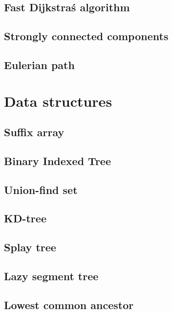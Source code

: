 \subsection{Fast Dijkstra\'s algorithm}
\raggedbottom
\hrulefill
\subsection{Strongly connected components}
\raggedbottom
\hrulefill
\subsection{Eulerian path}
\raggedbottom
\hrulefill

\section{Data structures}
\subsection{Suffix array}
\raggedbottom
\hrulefill
\subsection{Binary Indexed Tree}
\raggedbottom
\hrulefill
\subsection{Union-find set}
\raggedbottom
\hrulefill
\subsection{KD-tree}
\raggedbottom
\hrulefill
\subsection{Splay tree}
\raggedbottom
\hrulefill
\subsection{Lazy segment tree}
\raggedbottom
\hrulefill
\subsection{Lowest common ancestor}
\raggedbottom
\hrulefill

